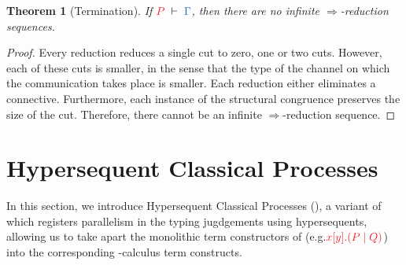 \documentclass[draft,submission,copyright,creativecommons]{eptcs}
\makeatletter
\newtheorem{theorem}{Theorem}
\renewcommand*{\eg}{e.g.\@\xspace}
\makeatother
\begin{document}
\begin{theorem}[Termination]\label{thm:cp-termination}
  If $\seq[P]{\Gamma}$, then there are no infinite $\Longrightarrow$-reduction
  sequences.
\end{theorem}\vspace*{-0.75\baselineskip}%
\begin{proof}
  Every reduction reduces a single cut to zero, one or two cuts.
  However, each of these cuts is smaller, in the sense that the type of the
  channel on which the communication takes place is smaller.
  Each reduction either eliminates a connective.
  Furthermore, each instance of the structural congruence preserves the size of
  the cut.
  Therefore, there cannot be an infinite $\Longrightarrow$-reduction sequence.
\end{proof}


\section{Hypersequent Classical Processes}
\label{sec:hcp}

In this section, we introduce Hypersequent Classical Processes (\hcp), a variant
of \cp which registers parallelism in the typing jugdgements using
hypersequents, allowing us to take apart the monolithic term constructors of \cp
(\eg $\tm{\cpSend{x}{y}{P}{Q}}$) into the corresponding \textpi-calculus term
constructs. 
\end{document}
